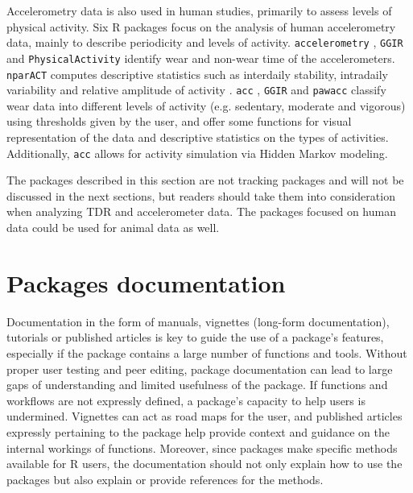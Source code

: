 \documentclass[a4paper,12pt]{article}
\newcommand{\Rpkg}[1]{\texttt{#1}}
\begin{document}
	Accelerometry data is also used in human studies, primarily to assess levels of physical activity. Six R packages focus on the analysis of human accelerometry data, mainly to describe periodicity and levels of activity. \Rpkg{accelerometry} \citep{Raccelerometry}, \Rpkg{GGIR} \citep{vanHees2014,vanHees2015,RGGIR} and \Rpkg{PhysicalActivity} \citep{RPhysicalActivity} identify wear and non-wear time of the accelerometers. \Rpkg{nparACT} computes descriptive statistics such as interdaily stability, intradaily variability and relative amplitude of activity \citep{Blume2016}. \Rpkg{acc} \citep{Racc}, \Rpkg{GGIR} and \Rpkg{pawacc} \citep{Geraci2012,Rpawacc} classify wear data into different levels of activity (e.g. sedentary, moderate and vigorous) using thresholds given by the user, and offer some functions for visual representation of the data and descriptive statistics on the types of activities. Additionally, \Rpkg{acc} allows for activity simulation via Hidden Markov modeling.
	
	The packages described in this section are not tracking packages and will not be discussed in the next sections, but readers should take them into consideration when analyzing TDR and accelerometer data. The packages focused on human data could be used for animal data as well. 
	
	\section*{Packages documentation}
	
	Documentation in the form of manuals, vignettes (long-form documentation), tutorials or published articles is key to guide the use of a package's features, especially if the package contains a large number of functions and tools. %
	Without proper user testing and peer editing, package documentation can lead to large gaps of understanding and limited usefulness of the package. If functions and workflows are not expressly defined, a package's capacity to help users is undermined. Vignettes can act as road maps for the user, and published articles expressly pertaining to the package help provide context and guidance on the internal workings of functions. Moreover, since packages make specific methods available for R users, the documentation should not only explain how to use the packages but also explain or provide references for the methods. %
	
\end{document}
